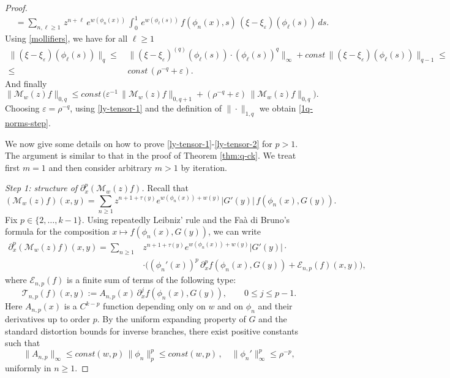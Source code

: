 \documentclass[11pt]{amsart}
\theoremstyle{definition}
\theoremstyle{remark}
\theoremstyle{definition}
\numberwithin{equation}{section}
\newcommand{\eps}{\varepsilon}
\newcommand{\MM}{\mathcal{M}}
\begin{document}
\begin{proof}
\[\begin{split}
&= \sum_{n,\ell \ge 1}\, z^{n+\ell}\, e^{w(\phi_n(x))}\, \int_0^1\, e^{w(\phi_\ell(s))}\, f(\phi_n(x),s)\, (\xi-\xi_\eps)(\phi_\ell(s))\, ds.
\end{split}
\]
Using \eqref{mollifiers}, we have for all $\ell\ge 1$
\[
\begin{split}
\| (\xi-\xi_\eps)(\phi_\ell(s)) \|_q \le &\, \| (\xi-\xi_\eps)^{(q)}(\phi_\ell(s)) \cdot (\phi_\ell(s))^q \|_\infty + const\, \| (\xi-\xi_\eps)(\phi_\ell(s)) \|_{q-1} \le \\[0.2cm]
\le &\, const\, (\rho^{-q} + \eps).
\end{split}
\]
And finally
\[
\|\MM_w(z)f\|_{0,q} \le const\, \Big( \eps^{-1} \, \|\MM_w(z)f\|_{0,q+1} + (\rho^{-q} + \eps)\, \|\MM_w(z)f\|_{0,q} \Big).
\]
Choosing $\eps = \rho^{-q}$, using \eqref{ly-tensor-1} and the definition of $\|\cdot\|_{1,q}$ we obtain \eqref{1q-norms-step}.

{We now give some details on how to prove \eqref{ly-tensor-1}-\eqref{ly-tensor-2} for $p>1$. The argument is similar to that in the proof of Theorem \ref{thm:q-ck}. We treat first $m=1$ and then consider arbitrary $m>1$ by iteration.

\noindent
\emph{Step 1: structure of $\partial_x^p(\MM_w(z)f)$.}
Recall that
\[
(\MM_w(z) f)(x,y)=\sum_{n\ge 1} z^{n+1+\tau(y)} e^{w(\phi_n(x))+w(y)}|G'(y)|\, f(\phi_n(x),G(y)).
\]
Fix $p\in\{2,\dots,k-1\}$. Using repeatedly Leibniz' rule and the Fa\`a di Bruno's formula for the composition $x\mapsto f(\phi_n(x),G(y))$, we can write
\begin{equation}\label{eq:Mp-decomp}
\begin{aligned}
\partial_x^p(\MM_w(z)f)(x,y)
= \sum_{n\ge 1} & z^{n+1+\tau(y)} e^{w(\phi_n(x))+w(y)}|G'(y)| \cdot \\[0.3cm]
& \cdot \Big((\phi_n'(x))^p\, \partial_x^p f(\phi_n(x),G(y)) + \mathcal{E}_{n,p}(f)(x,y)\Big),
\end{aligned}
\end{equation}
where $\mathcal{E}_{n,p}(f)$ is a finite sum of terms of the following type:
\[
\mathcal{T}_{n,p}(f)(x,y)
:=
A_{n,p}(x)\, \partial_x^{j} f(\phi_n(x),G(y)),
\qquad 0\le j\le p-1.
\]
Here $A_{n,p}(x)$ is a $C^{k-p}$ function depending only on $w$ and on $\phi_n$ and their derivatives up to order $p$. By the uniform expanding property of $G$ and the standard distortion bounds for inverse branches, there exist positive constants such that
\[
\|A_{n,p}\|_\infty \le const(w,p)\, \|\phi_n\|_p^{p}\le const(w,p)\, , \quad \|\phi_n'\|_\infty^p\le \rho^{-p},
\]
uniformly in $n\ge 1$.

}
\end{proof}
\end{document}
